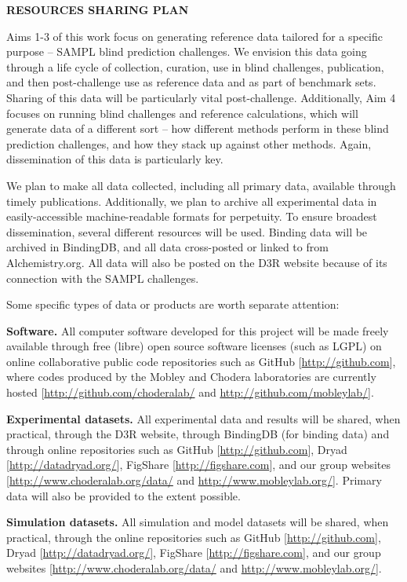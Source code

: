 \documentclass[11pt]{article}
\begin{document}

{\bf RESOURCES SHARING PLAN}

Aims 1-3 of this work focus on generating reference data tailored for a specific purpose -- SAMPL blind prediction challenges. 
We envision this data going through a life cycle of collection, curation, use in blind challenges, publication, and then post-challenge use as reference data and as part of benchmark sets. 
Sharing of this data will be particularly vital post-challenge. 
Additionally, Aim 4 focuses on running blind challenges and reference calculations, which will generate data of a different sort -- how different methods perform in these blind prediction challenges, and how they stack up against other methods. 
Again, dissemination of this data is particularly key. 

We plan to make all data collected, including all primary data, available through timely publications.
Additionally, we plan to archive all experimental data in easily-accessible machine-readable formats for perpetuity.
To ensure broadest dissemination, several different resources will be used. 
Binding data will be archived in BindingDB, and all data cross-posted or linked to from Alchemistry.org. 
All data will also be posted on the D3R website because of its connection with the SAMPL challenges. 

Some specific types of data or products are worth separate attention:

{\bf Software.} All computer software developed for this project will be made freely available through free (libre) open source software licenses (such as LGPL) on online collaborative public code repositories such as GitHub [\url{http://github.com}], where codes produced by the Mobley and Chodera laboratories are currently hosted [\url{http://github.com/choderalab/} and \url{http://github.com/mobleylab/}].

{\bf Experimental datasets.} All experimental data and results will be shared, when practical, through the D3R website, through BindingDB (for binding data) and through online repositories such as GitHub [\url{http://github.com}], Dryad [\url{http://datadryad.org/}], FigShare [\url{http://figshare.com}], and our group websites [\url{http://www.choderalab.org/data/} and \url{http://www.mobleylab.org/}]. Primary data will also be provided to the extent possible.

{\bf Simulation datasets.} All simulation and model datasets will be shared, when practical, through the online repositories such as GitHub [\url{http://github.com}], Dryad [\url{http://datadryad.org/}], FigShare [\url{http://figshare.com}], and our group websites [\url{http://www.choderalab.org/data/} and \url{http://www.mobleylab.org/}]. 
\end{document}
